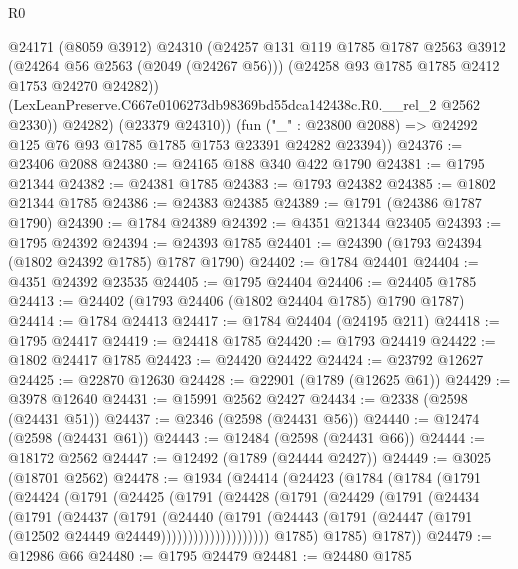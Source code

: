 \begin{lexlean}{R0}
\begin{coremodule}
            @24171
            (@8059 @3912)
            @24310
            (@24257
              @131
              @119
              @1785
              @1787
              @2563
              @3912
              (@24264 @56 @2563 (@2049 (@24267 @56)))
              (@24258 @93 @1785 @1785 @2412 @1753 @24270 @24282))
            (LexLeanPreserve.C667e0106273db98369bd55dca142438c.R0.__rel_2 @2562 @2330))
          @24282)
        (@23379 @24310))
      (fun ("_" : @23800 @2088) => @24292 @125 @76 @93 @1785 @1785 @1753 @23391 @24282 @23394))
@24376 := @23406 @2088
@24380 := @24165 @188 @340 @422 @1790
@24381 := @1795 @21344
@24382 := @24381 @1785
@24383 := @1793 @24382
@24385 := @1802 @21344 @1785
@24386 := @24383 @24385
@24389 := @1791 (@24386 @1787 @1790)
@24390 := @1784 @24389
@24392 := @4351 @21344 @23405
@24393 := @1795 @24392
@24394 := @24393 @1785
@24401 := @24390 (@1793 @24394 (@1802 @24392 @1785) @1787 @1790)
@24402 := @1784 @24401
@24404 := @4351 @24392 @23535
@24405 := @1795 @24404
@24406 := @24405 @1785
@24413 := @24402 (@1793 @24406 (@1802 @24404 @1785) @1790 @1787)
@24414 := @1784 @24413
@24417 := @1784 @24404 (@24195 @211)
@24418 := @1795 @24417
@24419 := @24418 @1785
@24420 := @1793 @24419
@24422 := @1802 @24417 @1785
@24423 := @24420 @24422
@24424 := @23792 @12627
@24425 := @22870 @12630
@24428 := @22901 (@1789 (@12625 @61))
@24429 := @3978 @12640
@24431 := @15991 @2562 @2427
@24434 := @2338 (@2598 (@24431 @51))
@24437 := @2346 (@2598 (@24431 @56))
@24440 := @12474 (@2598 (@24431 @61))
@24443 := @12484 (@2598 (@24431 @66))
@24444 := @18172 @2562
@24447 := @12492 (@1789 (@24444 @2427))
@24449 := @3025 (@18701 @2562)
@24478 := @1934
    (@24414
      (@24423
        (@1784
          (@1784
            (@1791
              (@24424
                (@1791
                  (@24425
                    (@1791
                      (@24428
                        (@1791
                          (@24429
                            (@1791
                              (@24434
                                (@1791
                                  (@24437
                                    (@1791
                                      (@24440
                                        (@1791
                                          (@24443
                                            (@1791
                                              (@24447
                                                (@1791 (@12502 @24449 @24449))))))))))))))))))))
            @1785)
          @1785)
        @1787))
@24479 := @12986 @66
@24480 := @1795 @24479
@24481 := @24480 @1785

\end{coremodule}
\end{lexlean}
